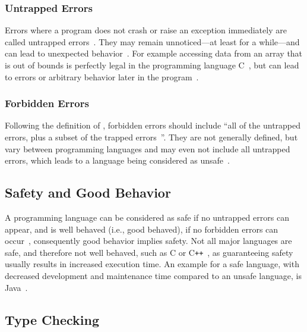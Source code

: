 \subsubsection{Untrapped Errors}

Errors where a program does not crash or raise an exception immediately are called untrapped errors~\cite[p.~37]{TypeSystems:Cardelli:2004}. They may remain unnoticed---at least for a while---and can lead to unexpected behavior~\cite[p.~3]{TypeSystems:Cardelli:2004}. For example accessing data from an array that is out of bounds is perfectly legal in the programming language C~\cite[p.~7]{TypesAndProgrammingLanguages:Pierce:2002}, but can lead to errors or arbitrary behavior later in the program~\cite[p.~3]{TypeSystems:Cardelli:2004}.

\subsubsection{Forbidden Errors}

Following the definition of \citeauthor{TypeSystems:Cardelli:2004}, forbidden errors should include ``all of the untrapped errors, plus a subset of the trapped errors~\cite[p.~3]{TypeSystems:Cardelli:2004}''. They are not generally defined, but vary between programming languages and may even not include all untrapped errors, which leads to a language being  considered as unsafe~\cite[p.~4]{TypeSystems:Cardelli:2004}.

\subsection{Safety and Good Behavior}
\label{sec:safety-good-behavior}

A programming language can be considered as safe if no untrapped errors can appear, and is well behaved (i.e., good behaved), if no forbidden errors can occur~\cite[p.~3]{TypeSystems:Cardelli:2004}, consequently good behavior implies safety. Not all major languages are safe, and therefore not well behaved, such as C or C\texttt{++}~\cite[p.~6]{TypesAndProgrammingLanguages:Pierce:2002}, as guaranteeing safety usually results in increased execution time. An example for a safe language, with decreased development and maintenance time compared to an unsafe language, is Java~\cite[p.~5]{TypeSystems:Cardelli:2004}.

\subsection{Type Checking}
\label{sec:type-checking}

